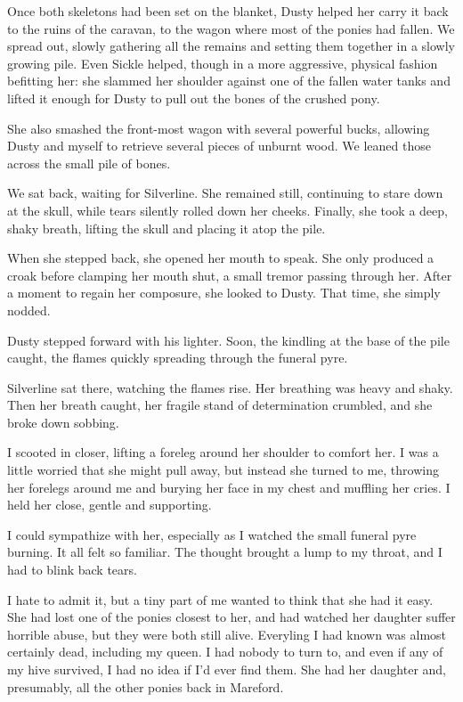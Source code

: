 Once both skeletons had been set on the blanket, Dusty helped her carry it back to the ruins of the caravan, to the wagon where most of the ponies had fallen. We spread out, slowly gathering all the remains and setting them together in a slowly growing pile. Even Sickle helped, though in a more aggressive, physical fashion befitting her: she slammed her shoulder against one of the fallen water tanks and lifted it enough for Dusty to pull out the bones of the crushed pony.

She also smashed the front-most wagon with several powerful bucks, allowing Dusty and myself to retrieve several pieces of unburnt wood. We leaned those across the small pile of bones.

We sat back, waiting for Silverline. She remained still, continuing to stare down at the skull, while tears silently rolled down her cheeks. Finally, she took a deep, shaky breath, lifting the skull and placing it atop the pile.

When she stepped back, she opened her mouth to speak. She only produced a croak before clamping her mouth shut, a small tremor passing through her. After a moment to regain her composure, she looked to Dusty. That time, she simply nodded.

Dusty stepped forward with his lighter. Soon, the kindling at the base of the pile caught, the flames quickly spreading through the funeral pyre.

Silverline sat there, watching the flames rise. Her breathing was heavy and shaky. Then her breath caught, her fragile stand of determination crumbled, and she broke down sobbing.

I scooted in closer, lifting a foreleg around her shoulder to comfort her. I was a little worried that she might pull away, but instead she turned to me, throwing her forelegs around me and burying her face in my chest and muffling her cries. I held her close, gentle and supporting.

I could sympathize with her, especially as I watched the small funeral pyre burning. It all felt so familiar. The thought brought a lump to my throat, and I had to blink back tears.

I hate to admit it, but a tiny part of me wanted to think that she had it easy. She had lost one of the ponies closest to her, and had watched her daughter suffer horrible abuse, but they were both still alive. Everyling I had known was almost certainly dead, including my queen. I had nobody to turn to, and even if any of my hive survived, I had no idea if I’d ever find them. She had her daughter and, presumably, all the other ponies back in Mareford.

